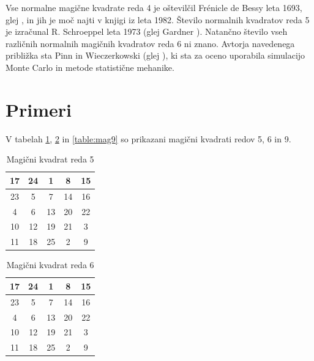 \documentclass[a4paper,12pt]{article}
\theoremstyle{definition}
\theoremstyle{plain}
\newenvironment{magic}[3]{
   \begin{table}[h]
      \Large
      \centering
      \caption{#1}
      \label{#3}
      \begin{tabular}{|*{#2}{c|}}
         \hline
         }{
      \end{tabular}
   \end{table}
}
\begin{document}
Vse normalne magične kvadrate reda 4 je oštevilčil Frénicle de Bessy
leta 1693, glej \cite{bessy}, in jih je moč najti v knjigi \cite{berlekamp}
iz leta 1982. Število normalnih kvadratov reda 5 je izračunal
R. Schroeppel leta 1973 (glej Gardner \cite{gardner}).
Natančno število vseh različnih normalnih magičnih kvadratov reda 6 ni znano.
Avtorja navedenega približka sta Pinn in Wieczerkowski (glej \cite{pinn}), ki
sta za oceno uporabila simulacijo Monte Carlo in metode statistične mehanike.


\section{Primeri}

V tabelah \ref{table:mag5}, \ref{table:mag6} in \ref{table:mag9} so prikazani
magični kvadrati redov 5, 6 in 9.





\begin{magic}{Magični kvadrat reda 5}{5}{table:mag5}
   17 & 24 &  1 &  8 & 15 \\\hline
   23 &  5 &  7 & 14 & 16 \\\hline
    4 &  6 & 13 & 20 & 22 \\\hline
   10 & 12 & 19 & 21 &  3 \\\hline
   11 & 18 & 25 &  2 &  9 \\\hline
\end{magic}





\begin{magic}{Magični kvadrat reda 6}{5}{table:mag6}
   17 & 24 &  1 &  8 & 15 \\\hline
   23 &  5 &  7 & 14 & 16 \\\hline
    4 &  6 & 13 & 20 & 22 \\\hline
   10 & 12 & 19 & 21 &  3 \\\hline
   11 & 18 & 25 &  2 &  9 \\\hline
\end{magic}
\end{document}
